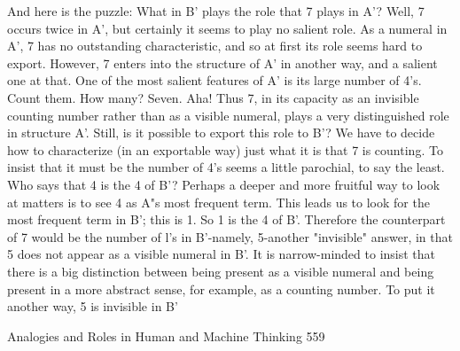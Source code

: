 And here is the puzzle: What in B' plays the role that 7 plays in A'? Well, 7 occurs
twice in A', but certainly it seems to play no salient role. As a numeral in A', 7 has no
outstanding characteristic, and so at first its role seems hard to export. However, 7
enters into the structure of A' in another way, and a salient one at that. One of the
most salient features of A' is its large number of 4's. Count them. How many? Seven.
Aha! Thus 7, in its capacity as an invisible counting number rather than as a visible
numeral, plays a very distinguished role in structure A'. Still, is it possible to export
this role to B'?
        We have to decide how to characterize (in an exportable way) just what it is
that 7 is counting. To insist that it must be the number of 4's seems a little parochial,
to say the least. Who says that 4 is the 4 of B'? Perhaps a deeper and more fruitful
way to look at matters is to see 4 as A"s most frequent term. This leads us to look for
the most frequent term in B'; this is 1. So 1 is the 4 of B'. Therefore the counterpart of
7 would be the number of l's in B'-namely, 5-another "invisible" answer, in that 5 does
not appear as a visible numeral in B'.
        It is narrow-minded to insist that there is a big distinction between being
present as a visible numeral and being present in a more abstract sense, for example,
as a counting number. To put it another way, 5 is invisible in B'




Analogies and Roles in Human and Machine Thinking                                     559

